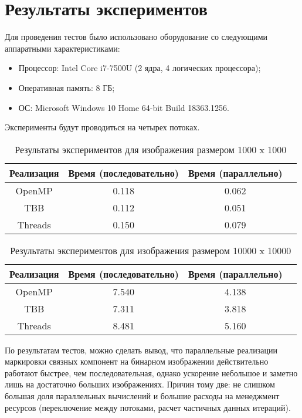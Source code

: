 \documentclass{report}
\begin{document}
	\section*{Результаты экспериментов}
	\par Для проведения тестов было использовано оборудование со следующими аппаратными характеристиками:
	\begin{itemize}
		\item Процессор: Intel Core i7-7500U (2 ядра, 4 логических процессора);
		\item Оперативная память: 8 ГБ;
		\item ОС: Microsoft Windows 10 Home 64-bit Build 18363.1256.
	\end{itemize}
    \par Эксперименты будут проводиться на четырех потоках.
	\begin{table}[!h]
		\caption{Результаты экспериментов для изображения размером 1000 x 1000}
		\centering
		\begin{tabular}{|c|c|c|c|}
            \hline
			Реализация & Время (последовательно) & Время (параллельно) \\
            \hline
			OpenMP         & 0.118           & 0.062  \\
			TBB            & 0.112           & 0.051  \\
			Threads        & 0.150           & 0.079  \\
            \hline
		\end{tabular}
	\end{table}
	\begin{table}[!h]
		\caption{Результаты экспериментов для изображения размером 10000 x 10000}
		\centering
		\begin{tabular}{|c|c|c|c|}
            \hline
            Реализация & Время (последовательно) & Время (параллельно) \\
            \hline
            OpenMP         & 7.540           & 4.138  \\
            TBB            & 7.311           & 3.818  \\
            Threads        & 8.481           & 5.160  \\
            \hline
		\end{tabular}
	\end{table}
	
	\par По результатам тестов, можно сделать вывод, что параллельные реализации маркировки связных компонент на бинарном изображении действительно работают быстрее, чем последовательная, однако ускорение небольшое и заметно лишь на достаточно больших изображениях. Причин тому две: не слишком большая доля параллельных вычислений и большие расходы на менеджмент ресурсов (переключение между потоками, расчет частичных данных итераций).
	\newpage
\end{document}
